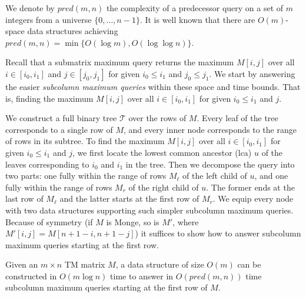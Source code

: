 \documentclass{llncs}
\newcommand{\pred}[1]{pred(#1)}
\begin{document}
We denote by $\pred{m,n}$ the complexity of a predecessor query on a set of $m$ integers from
a universe $\{0,\ldots,n-1\}$. It is well known
that there are $O(m)$-space data structures achieving $\pred{m,n} = \min\{O(\log m),O(\log\log n)\}$.

Recall
that a submatrix maximum query returns the maximum $M[i,j]$ over all $i\in [i_{0},i_{1}]$ and
$j\in [j_{0},j_{1}]$ for given $i_{0}\leq i_{1}$ and $j_{0}\leq
j_{1}$. We start by answering the easier 
 \emph{subcolumn maximum queries} within these space and time bounds. 
That is,  finding the maximum $M[i,j]$ over all $i\in [i_{0},i_{1}]$ for given
$i_{0}\leq i_{1}$ and $j$.

We construct a full binary tree $\mathcal T$ over the rows of $M$. Every leaf of the tree corresponds to a single row
of $M$, and every inner node corresponds to the range of rows in its subtree. To find the maximum $M[i,j]$ over all
$i\in [i_{0},i_{1}]$ for  given $i_{0}\leq i_{1}$ and $j$, we first
locate the lowest common ancestor (lca) $u$ of the leaves
corresponding to $i_{0}$ and $i_{1}$ in the tree. Then we decompose the query into two parts:
one fully within the range of rows $M_{\ell}$ of the left child of $u$, and one fully within
the range of rows $M_{r}$ of the right child of $u$. The former ends at the last row of $M_{\ell}$
and the latter starts at the first row of $M_{r}$. We equip every node with two data structures
supporting  such simpler subcolumn maximum queries. Because of symmetry (if $M$ is
Monge, so is $M'$, where $M'[i,j]=M[n+1-i,n+1-j]$) it suffices to show how to answer
subcolumn maximum queries starting at the first row. 

\begin{lemma}
\label{lem:subcolumn}
Given an $m\times n$ TM matrix $M$, a data structure of size $O(m)$ can be constructed
in $O(m\log n)$ time to answer in $O(\pred{m,n})$ time subcolumn maximum queries starting at the first row of $M$.
\end{lemma}
\end{document}
